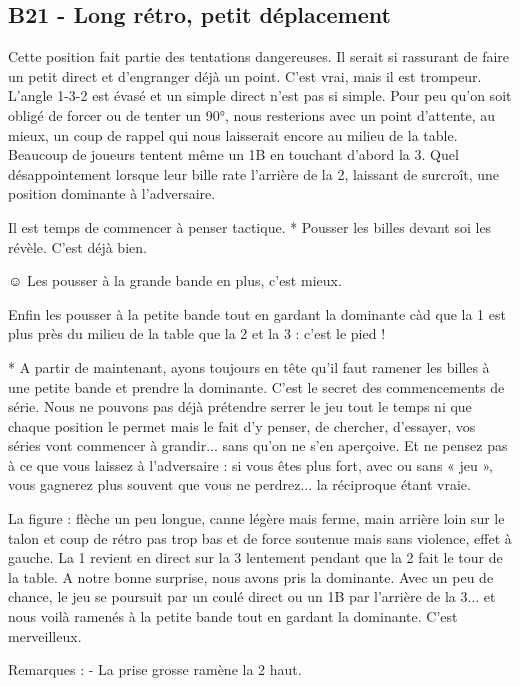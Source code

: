 \subsection{B21 - Long rétro, petit
déplacement}\label{b21---long-ruxe9tro-petit-duxe9placement}

Cette position fait partie des tentations dangereuses. Il serait si
rassurant de faire un petit direct et d'engranger déjà un point. C'est
vrai, mais il est trompeur. L'angle 1-3-2 est évasé et un simple direct
n'est pas si simple. Pour peu qu'on soit obligé de forcer ou de tenter
un 90°, nous resterions avec un point d'attente, au mieux, un coup de
rappel qui nous laisserait encore au milieu de la table. Beaucoup de
joueurs tentent même un 1B en touchant d'abord la 3. Quel
désappointement lorsque leur bille rate l'arrière de la 2, laissant de
surcroît, une position dominante à l'adversaire.

Il est temps de commencer à penser tactique. * Pousser les billes devant
soi les révèle. C'est déjà bien.

☺ Les pousser à la grande bande en plus, c'est mieux.

Enfin les pousser à la petite bande tout en gardant la dominante càd que
la 1 est plus près du milieu de la table que la 2 et la 3 : c'est le
pied !

* A partir de maintenant, ayons toujours en tête qu'il faut ramener les
billes à une petite bande et prendre la dominante. C'est le secret des
commencements de série. Nous ne pouvons pas déjà prétendre serrer le jeu
tout le temps ni que chaque position le permet mais le fait d'y penser,
de chercher, d'essayer, vos séries vont commencer à grandir... sans
qu'on ne s'en aperçoive. Et ne pensez pas à ce que vous laissez à
l'adversaire : si vous êtes plus fort, avec ou sans « jeu », vous
gagnerez plus souvent que vous ne perdrez... la réciproque étant vraie.

La figure : flèche un peu longue, canne légère mais ferme, main arrière
loin sur le talon et coup de rétro pas trop bas et de force soutenue
mais sans violence, effet à gauche. La 1 revient en direct sur la 3
lentement pendant que la 2 fait le tour de la table. A notre bonne
surprise, nous avons pris la dominante. Avec un peu de chance, le jeu se
poursuit par un coulé direct ou un 1B par l'arrière de la 3... et nous
voilà ramenés à la petite bande tout en gardant la dominante. C'est
merveilleux.

Remarques : - La prise grosse ramène la 2 haut.

